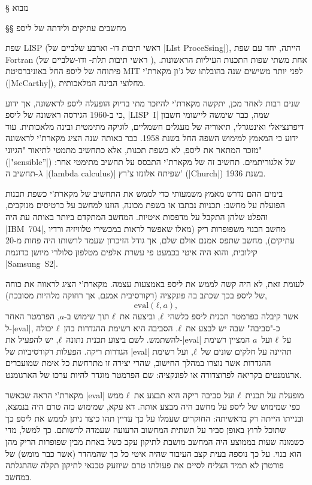 \def\CPL{\E|C|\xspace} 

\newcommand{\TopAlign}[1]{\adjustbox{valign=t}{#1}}

§ מבוא

§§ מחשבים עתיקים ולידתה של ליספ

שפת LISP (ראשי תיבות דו- וארבע שלביים של \E|LIst ProceSsing|), הייתה, יחד עם
שפת Fortran (ראשי תיבות תלת- ודו-שלביים של ), אחת משתי
שפות התכנות העיליות הראשונות. פיתוחה של ליספ החל באוניברסיטת MIT לפני יותר
משישים שנה בהובלתו של ג'ון מקארת'י (\E|McCarthy|), מחלוצי הבינה המלאכותית.

שנים רבות לאחר מכן, יתקשה מקארת'י להיזכר מתי בדיוק הופעלה ליספ לראשונה, אך ידוע
כי ב-1960 הגירסה ראשונה של ליספ, \E|LISP~I| שמה, כבר שימשה ליישומי חשבון
דיפרנציאלי ואינטגרלי, תיאוריה של מעגלים חשמליים, לוגיקה מתימטית ובינה מלאכותית.
עוד ידוע כי המאמץ למימוש השפה החל בשנת 1958. כבר באותה שנה הציג מקארת'י לראשונה
מזכר המתאר את ליספ, לא כשפת תכנות, אלא כתחשיב מתמטי לתיאור "הגיוני"
(\E|"sensible”|) של אלגוריתמים. תחשיב זה של מקארת'י התבסס על תחשיב מתימטי אחר:
תחשיב ה-$λ$ \E|(lambda calculus)| שפיתח אלונזו צ'רץ' (\E|Church|) בשנת 1936.

בימים ההם נדרש מאמץ משמעותי כדי לממש את התחשיב של מקארת'י כשפת תכנות הפועלת על
מחשב: תכניות נכתבו אז בשפת מכונה, הוזנו למחשב על כרטיסים מנוקבים, והפלט שלהן
התקבל על מדפסות איטיות. המחשב המתקדם ביותר באותה עת היה \E|IBM~704|, מחשב הבנוי
משפופרות ריק (מאלו שאפשר לראות במכשירי טלוויזיה ורדיו עתיקים), מחשב שתפס אמנם
אולם שלם, אך גודל הזיכרון שעמד לרשותו היה פחות מ-20 קילובית, והוא היה איטי
בכמעט פי עשרת אלפים מטלפון סלולרי מיושן כדוגמת \E|Samsung~S2|.

לעומת זאת, לא היה קשה לממש את ליספ באמצעות עצמה. מקארת'י הציג לראווה את כוחה
של ליספ בכך שכתב בה פונקציה (רקורסיבית אמנם, אך רחוקה מלהיות מסובכת),
\begin{equation} \label{eq:eval}
  \text{eval}(ℓ, a),
\end{equation}
אשר קיבלה כפרמטר תכנית ליספ כלשהי~$ℓ$, וביצעה את~$ℓ$ תוך שימוש ב-$a$, הפרמטר
האחר ל-\E|eval|, כ-"סביבה" שבה יש לבצע את~$ℓ$. הסביבה היא רשימת ההגדרות בהן~$ℓ$
יכולה להשתמש. לשם ביצוע תכנית נתונה~$ℓ$, יש להפעיל את-\E|eval| על~$ℓ$
ועל~$a$ המציין רשימת הגדרות ריקה. הפעלות רקורסיביות של \E|eval| תהיינה על חלקים
שונים של~$ℓ$, ועל רשימת ההגדרות אשר נוצרו במהלך החישוב, שהרי יצירה זו מתרחשת כל
אימת שמועברים ארגומנטים בקריאה לפרוצדורה או לפונקציה: שם הפרמטר מוגדר להיות
ערכו של הארגומנט.

מקארת'י הראה שכאשר \E|eval| מופעלת על תכנית~$ℓ$ ועל סביבה ריקה היא
תבצע את~$ℓ$ ממש כפי שמימוש של ליספ על מחשב היה מבצע אותה. דא עקא, שמימוש כזה
טרם היה בנמצא, ובנייתו הייתה רק בראשיתה: החוקרים שעמלו על כך עדיין תהו 
כיצד ניתן לממש את ליספ כך שתוכל לרוץ באופן סביר על תשתית המחשוב הרעועה שעמדה
לרשותם. כך למשל, מדי כשמונה שעות בממוצע היה המחשב מושבת לתיקון עקב כשל באחת
מבין שפופרות הריק מהן הוא בנוי. על כך נוספה בעית קצב העיבוד שהיה איטי כל כך
שהמהדר (אשר כבר מומש) של פורטרן לא תמיד הצליח לסיים את פעולתו טרם שיוזעק טכנאי
לתיקון תקלה שהתגלתה במחשב.

